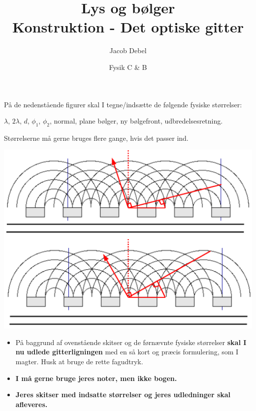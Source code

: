 \documentclass[a4paper, 12pt]{article}
\author{Jacob Debel}
\date{Fysik C \& B}
\title{Lys og bølger\\\medskip
\large Konstruktion - Det optiske gitter}
\begin{document}
\maketitle
På de nedenstående figurer skal I tegne/indsætte de følgende fysiske størrelser:

\(\lambda\), \(2 \lambda\), \(d\), \(\phi_1\), \(\phi_2\), normal, plane bølger, ny bølgefront, udbredelsesretning.

Størrelserne må gerne bruges flere gange, hvis det passer ind.

\begin{center}
\includegraphics[width=.9\linewidth]{./img/gitterudledning.png}
\end{center}

\begin{itemize}
\item På baggrund af ovenstående skitser og de førnævnte fysiske størrelser \textbf{skal I nu udlede gitterligningen} med en så kort og præcis formulering, som I magter. Husk at bruge de rette fagudtryk.

\item \textbf{I må gerne bruge jeres noter, men ikke bogen.}

\item \textbf{Jeres skitser med indsatte størrelser og jeres udledninger skal afleveres.}
\end{itemize}
\end{document}

